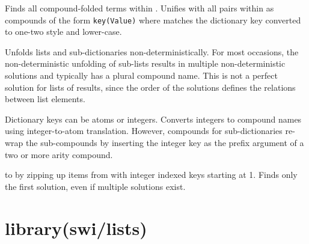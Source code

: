 \begin{description}
Finds all compound-folded terms within . Unifies with all pairs
within  as compounds of the form \verb$key(Value)$ where  matches
the dictionary key converted to one-two style and lower-case.

Unfolds lists and sub-dictionaries non-deterministically. For most
occasions, the non-deterministic unfolding of sub-lists results in
multiple non-deterministic solutions and typically has a plural
compound name. This is not a perfect solution for lists of results,
since the order of the solutions defines the relations between list
elements.

Dictionary keys can be atoms or integers. Converts integers to
compound names using integer-to-atom translation. However, compounds
for sub-dictionaries re-wrap the sub-compounds by inserting the
integer key as the prefix argument of a two or more arity compound.

 to  by zipping up items from  with integer indexed keys
starting at 1. Finds only the first solution, even if multiple
solutions exist.
\end{description}

\chapter{library(swi/lists)}\label{sec:lists}

